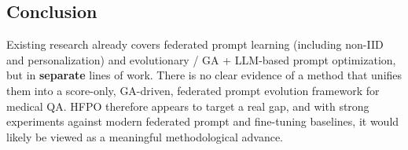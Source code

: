 \subsection*{Conclusion}


Existing research already covers federated prompt learning (including non-IID and personalization) and evolutionary / GA + LLM-based prompt optimization, but in \textbf{separate} lines of work. There is no clear evidence of a method that unifies them into a score-only, GA-driven, federated prompt evolution framework for medical QA. HFPO therefore appears to target a real gap, and with strong experiments against modern federated prompt and fine-tuning baselines, it would likely be viewed as a meaningful methodological advance.




